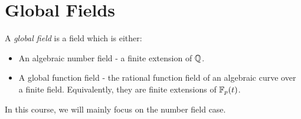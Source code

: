 \documentclass[10pt,a4paper]{article}
\begin{document}
\section{Global Fields}
\begin{definition}
  A \emph{global field} is a field which is either:
  \begin{itemize}
    \item An algebraic number field - a finite extension of $\mathbb{Q}$.
    \item A global function field - the rational function field of an algebraic curve over a finite field. Equivalently, they are finite extensions of $\mathbb{F}_p(t)$.
  \end{itemize}
\end{definition}
In this course, we will mainly focus on the number field case.
\end{document}
